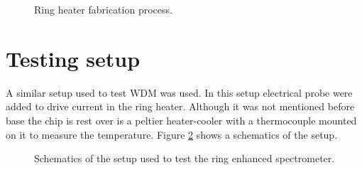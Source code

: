 \documentclass[12pt,twoside,english]{book}
\renewcommand{\~}{\perispomeni}%
\numberwithin{equation}{section}
\numberwithin{figure}{section}
\begin{document}
%
\begin{figure}[h]

\caption{Ring heater fabrication process.}
\label{fig:fabrication heater}
\end{figure}

\begin{figure}[h]
	\center{}
	\caption{}
\end{figure}


\section{Testing setup}
A similar setup used to test WDM was used. In this setup electrical probe were added to drive current in the ring heater. Although it was not mentioned before base the chip is rest over is a peltier heater-cooler with a thermocouple mounted on it to measure the temperature. Figure \ref{fig:setup2} shows a schematics of the setup.
\begin{figure}[h]
\center{}
\caption{Schematics of the setup used to test the ring enhanced spectrometer.}
\label{fig:setup2}
\end{figure}
\end{document}
